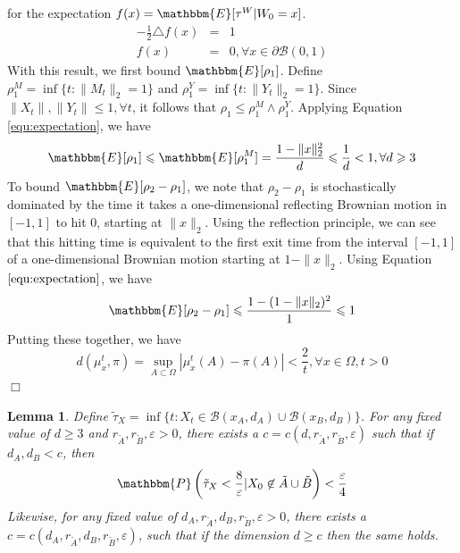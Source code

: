 \documentclass[english, aip, jcp, priprint, graphicx,floatfix]{revtex4-1}
\newtheorem{lemma}{Lemma}
\theoremstyle{plain}
\theoremstyle{definition}
\theoremstyle{plain}
\begin{document}
for the expectation $f (x) =\mathbbm{E} [\tau^W |W_0 = x]$.
\begin{eqnarray*}
- \frac{1}{2} \triangle f (x) & = & 1\\
f (x) & = & 0, \forall x \in \partial \mathcal{B} (0, 1)
\end{eqnarray*}
With this result, we first bound $\mathbbm{E} [\rho_1]$. Define $\rho_1^M =
\inf \{ t : \| M_t \|_2 = 1 \}$ and $\rho_1^Y = \inf \{ t : \| Y_t \|_2 = 1
\}$. Since $\| X_t \|, \| Y_t \| \leqslant 1, \forall t$, it follows that
$\rho_1 \leqslant \rho_1^M \wedge \rho_1^Y$. Applying Equation
\ref{equ:expectation}, we have
\[ \mathbbm{E} [\rho_1] \leqslant \mathbbm{E} [\rho_1^M] = \frac{1 - \| x
\|^2_2}{d} \leqslant \frac{1}{d} < 1, \forall d \geqslant 3 \]
To bound $\mathbbm{E} [\rho_2 - \rho_1]$, we note that $\rho_2 - \rho_1$ is
stochastically dominated by the time it takes a one-dimensional reflecting
Brownian motion in $[- 1, 1]$ to hit $0$, starting at $\| x \|_2$. Using the
reflection principle, we can see that this hitting time is equivalent to the
first exit time from the interval $[- 1, 1]$ of a one-dimensional Brownian
motion starting at $1 - \| x \|^{}_2$. Using Equation $\ref{equ:expectation}$,
we have
\[ \mathbbm{E} [\rho_2 - \rho_1] \leqslant \frac{1 - (1 - \| x \|_2)^2}{1}
\leqslant 1 \]
Putting these together, we have
\[ d (\mu_x^t, \pi) = \sup_{A \subset \Omega} | \mu_x^t (A) - \pi (A) | <
\frac{2}{t}, \forall x \in \Omega, t > 0 \]
\hspace*{\fill}$\Box$\medskip

\begin{lemma}
\label{lem:longtime}Define $\tilde{\tau}_X = \inf \{ t : X_t \in \mathcal{B}
(x_A, d_A) \cup \mathcal{B} (x_B, d_B) \}$. For any fixed value of $d
\geqslant 3$ and $r_{\tilde{A}}, r_{\tilde{B}}, \varepsilon > 0$, there
exists a $c = c (d, r_{\tilde{A}}, r_{\tilde{B}}, \varepsilon)$ such that if
$d_A, d_B < c$, then
\[ \mathbbm{P} \left( \tilde{\tau}_X < \frac{8}{\varepsilon} |X_0 \not\in
\tilde{A} \cup \tilde{B} \right) < \frac{\varepsilon}{4} \]
Likewise, for any fixed value of $d_A, r_{\tilde{A}}, d_B, r_{\tilde{B}},
\varepsilon > 0$, there exists a $c = c (d_A, r_{\tilde{A}}, d_B,
r_{\tilde{B}}, \varepsilon)$, such that if the dimension $d \geqslant c$
then the same holds.
\end{lemma}
\end{document}
